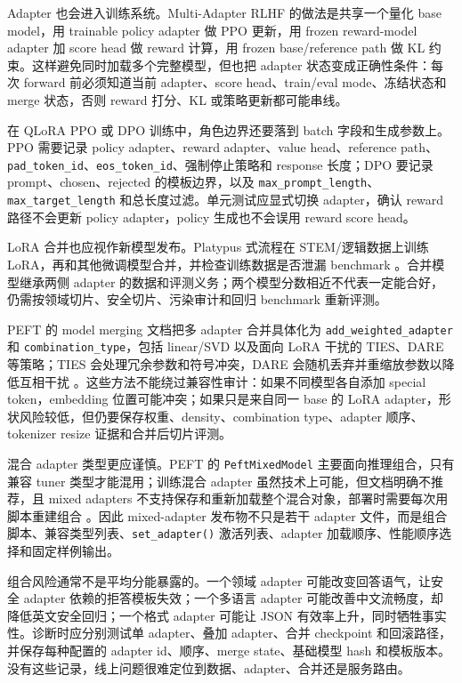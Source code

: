 \documentclass[UTF8,zihao=-4,openany]{ctexbook}
\begin{document}
Adapter 也会进入训练系统。Multi-Adapter RLHF 的做法是共享一个量化 base model，用 trainable policy adapter 做 PPO 更新，用 frozen reward-model adapter 加 score head 做 reward 计算，用 frozen base/reference path 做 KL 约束。这样避免同时加载多个完整模型，但也把 adapter 状态变成正确性条件：每次 forward 前必须知道当前 adapter、score head、train/eval mode、冻结状态和 merge 状态，否则 reward 打分、KL 或策略更新都可能串线。

在 QLoRA PPO 或 DPO 训练中，角色边界还要落到 batch 字段和生成参数上。PPO 需要记录 policy adapter、reward adapter、value head、reference path、\texttt{pad\_token\_id}、\texttt{eos\_token\_id}、强制停止策略和 response 长度；DPO 要记录 prompt、chosen、rejected 的模板边界，以及 \texttt{max\_prompt\_length}、\texttt{max\_target\_length} 和总长度过滤。单元测试应显式切换 adapter，确认 reward 路径不会更新 policy adapter，policy 生成也不会误用 reward score head。

LoRA 合并也应视作新模型发布。Platypus 式流程在 STEM/逻辑数据上训练 LoRA，再和其他微调模型合并，并检查训练数据是否泄漏 benchmark \cite{lee2023platypus}。合并模型继承两侧 adapter 的数据和评测义务；两个模型分数相近不代表一定能合好，仍需按领域切片、安全切片、污染审计和回归 benchmark 重新评测。

PEFT 的 model merging 文档把多 adapter 合并具体化为 \texttt{add\_weighted\_adapter} 和 \texttt{combination\_type}，包括 linear/SVD 以及面向 LoRA 干扰的 TIES、DARE 等策略；TIES 会处理冗余参数和符号冲突，DARE 会随机丢弃并重缩放参数以降低互相干扰 \cite{huggingface2026peftmodelmerging}。这些方法不能绕过兼容性审计：如果不同模型各自添加 special token，embedding 位置可能冲突；如果只是来自同一 base 的 LoRA adapter，形状风险较低，但仍要保存权重、density、combination type、adapter 顺序、tokenizer resize 证据和合并后切片评测。

混合 adapter 类型更应谨慎。PEFT 的 \texttt{PeftMixedModel} 主要面向推理组合，只有兼容 tuner 类型才能混用；训练混合 adapter 虽然技术上可能，但文档明确不推荐，且 mixed adapters 不支持保存和重新加载整个混合对象，部署时需要每次用脚本重建组合 \cite{huggingface2026peftmixedadapters}。因此 mixed-adapter 发布物不只是若干 adapter 文件，而是组合脚本、兼容类型列表、\texttt{set\_adapter()} 激活列表、adapter 加载顺序、性能顺序选择和固定样例输出。

组合风险通常不是平均分能暴露的。一个领域 adapter 可能改变回答语气，让安全 adapter 依赖的拒答模板失效；一个多语言 adapter 可能改善中文流畅度，却降低英文安全回归；一个格式 adapter 可能让 JSON 有效率上升，同时牺牲事实性。诊断时应分别测试单 adapter、叠加 adapter、合并 checkpoint 和回滚路径，并保存每种配置的 adapter id、顺序、merge state、基础模型 hash 和模板版本。没有这些记录，线上问题很难定位到数据、adapter、合并还是服务路由。
\end{document}
